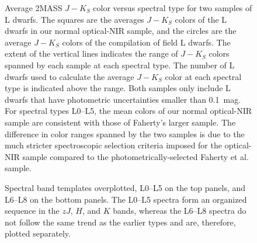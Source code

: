 \documentclass[12pt,preprint]{aastex}
\begin{document}

\begin{figure}
		\caption{Average 2MASS $J-K_S$ color versus spectral type for two samples of L dwarfs. The squares are the averages $J-K_S$ colors of the L dwarfs in our normal optical-NIR sample, and the circles are the average $J-K_S$ colors of the \citet{Faherty13_0355} compilation of field L dwarfs. The extent of the vertical lines indicates the range of $J-K_S$ colors spanned by each sample at each spectral type. The number of L dwarfs used to calculate the average $J-K_S$ color at each spectral type is indicated above the range. Both samples only include L dwarfs that have photometric uncertainties smaller than 0.1~mag. For spectral types L0--L5, the mean colors of our normal optical-NIR sample are consistent with those of Faherty's larger sample. The difference in color ranges spanned by the two samples is due to the much stricter spectroscopic selection criteria imposed for the optical-NIR sample compared to the photometrically-selected Faherty et al. sample. 
}
	\label{fig:JK_colors_F13}
\end{figure}

\begin{figure}
	\caption{Spectral band templates overplotted, L0--L5 on the top panels, and L6--L8 on the bottom panels. %
	The L0--L5 spectra form an organized sequence in the $zJ$, $H$, and $K$ bands, whereas the L6--L8 spectra do not follow the same trend as the earlier types and are, therefore, plotted separately.}
	\label{fig:spec_sequence}
\end{figure}




\end{document}
